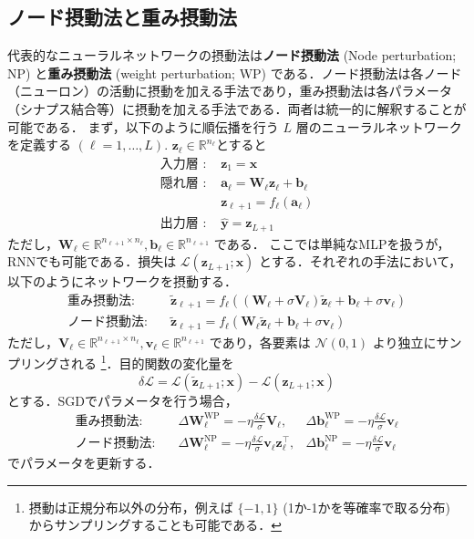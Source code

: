\subsection{ノード摂動法と重み摂動法}
代表的なニューラルネットワークの摂動法は\textbf{ノード摂動法} (Node perturbation; NP) と\textbf{重み摂動法} (weight perturbation; WP) である．ノード摂動法は各ノード（ニューロン）の活動に摂動を加える手法であり，重み摂動法は各パラメータ（シナプス結合等）に摂動を加える手法である．両者は統一的に解釈することが可能である．
まず，以下のように順伝播を行う $L$ 層のニューラルネットワークを定義する $(\ell=1,\ldots,L)$. $\mathbf{z}_{\ell}\in \mathbb{R}^{n_\ell}$とすると
\begin{align}
\text{入力層 : }&\mathbf{z}_1=\mathbf{x}\\
\text{隠れ層 : }&\mathbf{a}_\ell=\mathbf{W}_\ell \mathbf{z}_\ell +\mathbf{b}_\ell\\
&\mathbf{z}_{\ell+1}=f_\ell\left(\mathbf{a}_\ell\right)\\
\text{出力層 : }&\hat{\mathbf{y}}=\mathbf{z}_{L+1}
\end{align}
ただし，$\mathbf{W}_\ell \in \mathbb{R}^{n_{\ell+1}\times n_{\ell}}, \mathbf{b}_\ell \in \mathbb{R}^{n_{\ell+1}}$ である．
ここでは単純なMLPを扱うが，RNNでも可能である．損失は $\mathcal{L}(\mathbf{z}_{L+1}; \mathbf{x})$ とする．それぞれの手法において，以下のようにネットワークを摂動する．
\begin{align}
\text{重み摂動法:}\quad &\tilde{\mathbf{z}}_{\ell+1}=f_\ell\left((\mathbf{W}_\ell+\sigma \mathbf{V}_\ell) \tilde{\mathbf{z}}_\ell +\mathbf{b}_\ell +\sigma \mathbf{v}_\ell\right)\\
\text{ノード摂動法:}\quad &\tilde{\mathbf{z}}_{\ell+1}=f_\ell\left(\mathbf{W}_\ell \tilde{\mathbf{z}}_\ell +\mathbf{b}_\ell+\sigma \mathbf{v}_\ell \right)
\end{align}
ただし，$\mathbf{V}_\ell \in \mathbb{R}^{n_{\ell+1}\times n_{\ell}}, \mathbf{v}_\ell \in \mathbb{R}^{n_{\ell+1}}$ であり，各要素は $\mathcal{N}(0, 1)$ より独立にサンプリングされる \footnote{摂動は正規分布以外の分布，例えば $\{-1, 1\}$ (1か-1かを等確率で取る分布) からサンプリングすることも可能である．}．目的関数の変化量を
\begin{equation}
\delta \mathcal{L}=\mathcal{L}(\tilde{\mathbf{z}}_{L+1}; \mathbf{x})-\mathcal{L}(\mathbf{z}_{L+1}; \mathbf{x})
\end{equation}
とする．SGDでパラメータを行う場合，
\begin{align}
\text{重み摂動法:}\quad &\Delta \mathbf{W}_\ell^{\mathrm{WP}}=-\eta \frac{\delta \mathcal{L}}{\sigma}\mathbf{V}_\ell, &\Delta \mathbf{b}_\ell^{\mathrm{WP}}=-\eta \frac{\delta \mathcal{L}}{\sigma}\mathbf{v}_\ell\\
\text{ノード摂動法:}\quad &\Delta \mathbf{W}_\ell^{\mathrm{NP}}=- \eta  \frac{\delta \mathcal{L}}{\sigma} \mathbf{v}_\ell \mathbf{z}_{\ell}^\top, &\Delta \mathbf{b}_\ell^{\mathrm{NP}} =- \eta  \frac{\delta \mathcal{L}}{\sigma} \mathbf{v}_\ell
\end{align}
でパラメータを更新する．
